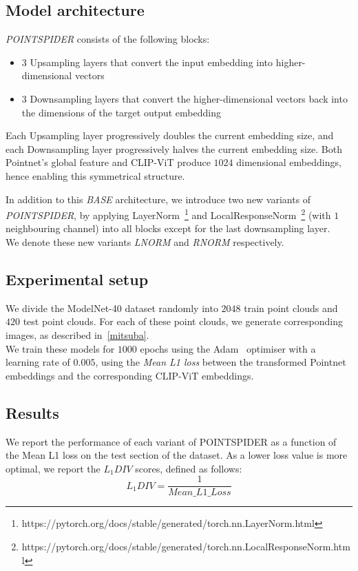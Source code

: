 \documentclass[letterpaper, 10 pt, conference]{ieeeconf}  %
\begin{document}
\subsection{Model architecture}
\label{alignment:arch}
\textit{POINTSPIDER} consists of the following blocks:
\begin{itemize}
    \item $3$ Upsampling layers that convert the input embedding into higher-dimensional vectors
    \item $3$ Downsampling layers that convert the higher-dimensional vectors back into the dimensions of the target output embedding
\end{itemize}
Each Upsampling layer progressively doubles the current embedding size, and each Downsampling layer progressively halves the current embedding size. Both Pointnet's global feature and CLIP-ViT produce $1024$ dimensional embeddings, hence enabling this symmetrical structure.

In addition to this \textit{BASE} architecture, we introduce two new variants of \textit{POINTSPIDER}, by applying LayerNorm~\footnote{https://pytorch.org/docs/stable/generated/torch.nn.LayerNorm.html} and LocalResponseNorm~\footnote{https://pytorch.org/docs/stable/generated/torch.nn.LocalResponseNorm.html} (with $1$ neighbouring channel) into all blocks except for the last downsampling layer. 
\\
We denote these new variants \textit{LNORM} and \textit{RNORM} respectively.

\subsection{Experimental setup}
\label{alignment:experiment}
We divide the ModelNet-40 dataset randomly into $2048$ train point clouds and $420$ test point clouds. For each of these point clouds, we generate corresponding images, as described in~\ref{mitsuba}. \\ 
We train these models for $1000$ epochs using the Adam~\cite{DBLP:journals/corr/KingmaB14} optimiser with a learning rate of $0.005$, using the \textit{Mean L1 loss} between the transformed Pointnet embeddings and the corresponding CLIP-ViT embeddings. 

\subsection{Results}
\label{alignment:metrics}
We report the performance of each variant of POINTSPIDER as a function of the Mean L1 loss on the test section of the dataset. As a lower loss value is more optimal, we report the \textit{$L_1DIV$} scores, defined as follows:
\[ L_1DIV = \frac{1}{Mean\_L1\_Loss} \]
\end{document}
